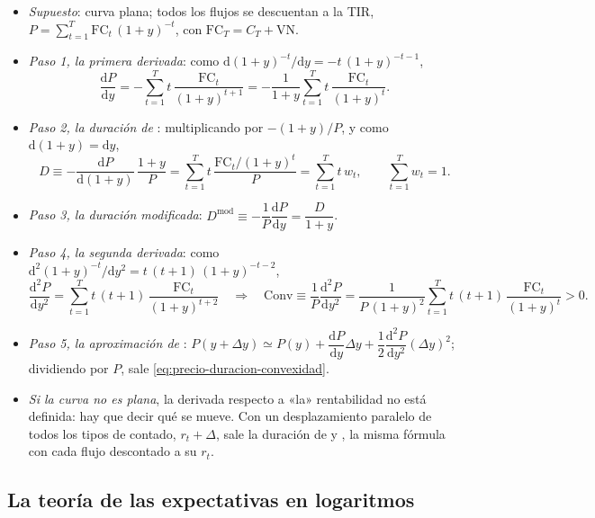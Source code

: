 \documentclass[11pt]{article}
\begin{document}
\begin{itemize}
\item \emph{Supuesto}: curva plana; todos los flujos se descuentan a la TIR, $P=\sum_{t=1}^{T}\mathrm{FC}_t\,(1+y)^{-t}$, con $\mathrm{FC}_T=C_T+\mathrm{VN}$.
\item \emph{Paso 1, la primera derivada}: como $\mathrm{d}(1+y)^{-t}/\mathrm{d}y=-t\,(1+y)^{-t-1}$,
  \[
  \frac{\mathrm{d}P}{\mathrm{d}y}=-\sum_{t=1}^{T}t\,\frac{\mathrm{FC}_t}{(1+y)^{t+1}}=-\frac{1}{1+y}\sum_{t=1}^{T}t\,\frac{\mathrm{FC}_t}{(1+y)^{t}} .
  \]
\item \emph{Paso 2, la duración de }: multiplicando por $-(1+y)/P$, y como $\mathrm{d}(1+y)=\mathrm{d}y$,
  \[
  D\equiv-\frac{\mathrm{d}P}{\mathrm{d}(1+y)}\,\frac{1+y}{P}=\sum_{t=1}^{T}t\,\frac{\mathrm{FC}_t/(1+y)^t}{P}=\sum_{t=1}^{T}t\,w_t ,
  \qquad\sum_{t=1}^{T}w_t=1 .
  \]
\item \emph{Paso 3, la duración modificada}: $D^{\mathrm{mod}}\equiv-\dfrac{1}{P}\dfrac{\mathrm{d}P}{\mathrm{d}y}=\dfrac{D}{1+y}$.
\item \emph{Paso 4, la segunda derivada}: como $\mathrm{d}^2(1+y)^{-t}/\mathrm{d}y^2=t\,(t+1)\,(1+y)^{-t-2}$,
  \[
  \frac{\mathrm{d}^2P}{\mathrm{d}y^2}=\sum_{t=1}^{T}t\,(t+1)\,\frac{\mathrm{FC}_t}{(1+y)^{t+2}}
  \quad\Longrightarrow\quad
  \mathrm{Conv}\equiv\frac{1}{P}\frac{\mathrm{d}^2P}{\mathrm{d}y^2}=\frac{1}{P\,(1+y)^2}\sum_{t=1}^{T}t\,(t+1)\,\frac{\mathrm{FC}_t}{(1+y)^{t}}>0 .
  \]
\item \emph{Paso 5, la aproximación de }: $P(y+\Delta y)\simeq P(y)+\dfrac{\mathrm{d}P}{\mathrm{d}y}\Delta y+\dfrac12\dfrac{\mathrm{d}^2P}{\mathrm{d}y^2}(\Delta y)^2$; dividiendo por $P$, sale \eqref{eq:precio-duracion-convexidad}.
\item \emph{Si la curva no es plana}, la derivada respecto a «la» rentabilidad no está definida: hay que decir qué se mueve. Con un desplazamiento paralelo de todos los tipos de contado, $r_t+\Delta$, sale la duración de  y , la misma fórmula con cada flujo descontado a su $r_t$.\findemo
\end{itemize}

\subsection{La teoría de las expectativas en logaritmos}
\end{document}
